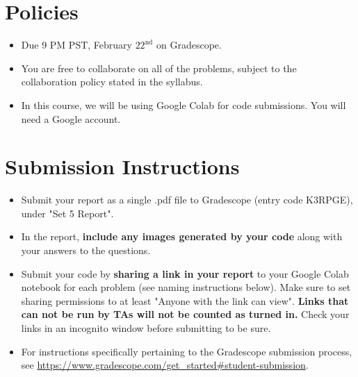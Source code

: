 \newif\ifshowsolutions
\showsolutionstrue






\DeclareMathOperator{\Tr}{Tr}


\pagestyle{fancy}





\section*{Policies}
\begin{itemize}
	\item Due 9 PM PST, February $22^\text{nd}$ on Gradescope. 
	\item You are free to collaborate on all of the problems, subject to the collaboration policy stated in the syllabus.
	\item In this course, we will be using Google Colab for code submissions. You will need a Google account.
\end{itemize}

\section*{Submission Instructions}

\begin{itemize}
	\item Submit your report as a single .pdf file to Gradescope (entry code K3RPGE), under "Set 5 Report". 
	\item In the report, \textbf{include any images generated by your code} along with your answers to the questions.
	\item Submit your code by \textbf{sharing a link in your report} to your Google Colab notebook for each problem (see naming instructions below). Make sure to set sharing permissions to at least "Anyone with the link can view". \textbf{Links that can not be run by TAs will not be counted as turned in.} Check your links in an incognito window before submitting to be sure. 
	\item For instructions specifically pertaining to the Gradescope submission process, see \url{https://www.gradescope.com/get_started#student-submission}.
	
\end{itemize}



